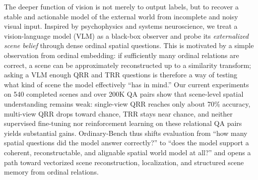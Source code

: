 The deeper function of vision is not merely to output labels, but to recover a stable and actionable model of the external world from incomplete and noisy visual input. Inspired by psychophysics and systems neuroscience, we treat a vision-language model (VLM) as a black-box observer and probe its \emph{externalized scene belief} through dense ordinal spatial questions. This is motivated by a simple observation from ordinal embedding: if sufficiently many ordinal relations are correct, a scene can be approximately reconstructed up to a similarity transform; asking a VLM enough QRR and TRR questions is therefore a way of testing what kind of scene the model effectively ``has in mind.'' Our current experiments on 540 completed scenes and over 200K QA pairs show that scene-level spatial understanding remains weak: single-view QRR reaches only about 70\% accuracy, multi-view QRR drops toward chance, TRR stays near chance, and neither supervised fine-tuning nor reinforcement learning on these relational QA pairs yields substantial gains. Ordinary-Bench thus shifts evaluation from ``how many spatial questions did the model answer correctly?'' to ``does the model support a coherent, reconstructable, and alignable spatial world model at all?'' and opens a path toward vectorized scene reconstruction, localization, and structured scene memory from ordinal relations.
